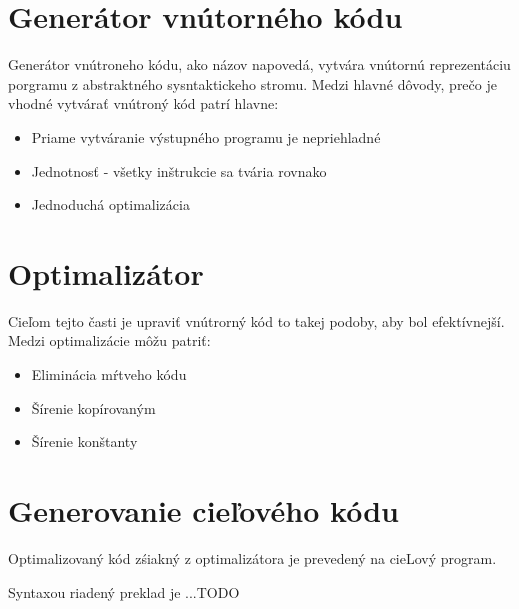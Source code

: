 \section{Generátor vnútorného kódu}
Generátor vnútroneho kódu, ako názov napovedá, vytvára vnútornú reprezentáciu porgramu
z abstraktného sysntaktickeho stromu. Medzi hlavné dôvody, prečo je vhodné
vytvárať vnútroný kód patrí hlavne:
\begin{itemize}
    \item Priame vytváranie výstupného programu je nepriehladné
    \item Jednotnosť - všetky inštrukcie sa tvária rovnako
    \item Jednoduchá optimalizácia
\end{itemize}

\section{Optimalizátor}
Cieľom tejto časti je upraviť vnútrorný kód to takej podoby, aby bol efektívnejší.
Medzi optimalizácie môžu patriť:
\begin{itemize}
    \item Eliminácia mŕtveho kódu
    \item Šírenie kopírovaným
    \item Šírenie konštanty
\end{itemize}

\section{Generovanie cieľového kódu}
Optimalizovaný kód zśiakný z optimalizátora je prevedený na cieLový program.

Syntaxou riadený preklad je ...TODO

